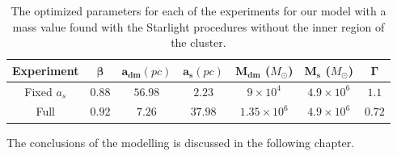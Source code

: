 \begin{table}[H]
\begin{center}
\begin{tabular}{| c| c| c| c| c| c| c|}
    \hline
    \textbf{Experiment} & $\mathbf{\beta}$ & $\mathbf{a_{dm}} (pc)$ & $\mathbf{a_{s}} (pc)$ & $\mathbf{M_{dm}}$ ($M_{\odot}$) & $\mathbf{M_{s}}$ ($M_{\odot}$) & $\mathbf{\Gamma}$\\ \hline
	Fixed $a_s$ &	$0.88$ &	$56.98$ &	$2.23$ &	$9 \times 10^{4}$ &	$4.9 \times 10 ^{6}$ &	$1.1$\\ \hline
	Full &	$0.92$ &	$7.26$ &	$37.98$ &	$1.35 \times 10^{6}$ &	$4.9 \times 10^{6}$ &	$0.72$\\ \hline
  \end{tabular} 
\caption[Optimized parameters for our model with a mass value based on the Starlight procedures without the inner region.]{The optimized parameters for each of the experiments for our model with a mass value found with the Starlight procedures without the inner region of the cluster.}
\end{center}  
\end{table}

The conclusions of the modelling is discussed in the following chapter.